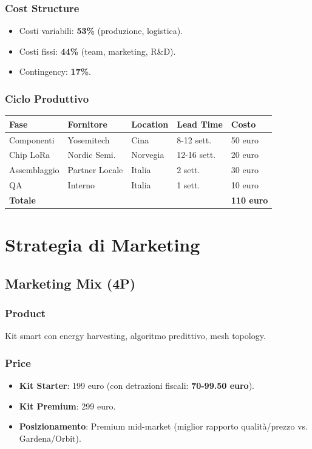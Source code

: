 \documentclass[11pt,a4paper]{report}
\begin{document}
\subsection{Cost Structure}
\begin{itemize}
\item Costi variabili: {\bf 53\%} (produzione, logistica).
\item Costi fissi: {\bf 44\%} (team, marketing, R\&D).
\item Contingency: {\bf 17\%}.
\end{itemize}

\subsection{Ciclo Produttivo}
\begin{longtable}{|L{3cm}|L{2.5cm}|L{2cm}|L{2cm}|C{1.5cm}|}
\hline
{\bf Fase} & {\bf Fornitore} & {\bf Location} & {\bf Lead Time} & {\bf Costo} \\ \hline
Componenti & Yosemitech & Cina & 8-12 sett. & 50 euro \\
Chip LoRa & Nordic Semi. & Norvegia & 12-16 sett. & 20 euro \\
Assemblaggio & Partner Locale & Italia & 2 sett. & 30 euro \\
QA & Interno & Italia & 1 sett. & 10 euro \\ \hline
{\bf Totale} & & & & {\bf 110 euro} \\ \hline
\end{longtable}

\chapter{Strategia di Marketing}
\label{ch:marketing}

\section{Marketing Mix (4P)}
\subsection{Product}
Kit smart con energy harvesting, algoritmo predittivo, mesh topology.

\subsection{Price}
\begin{itemize}
\item {\bf Kit Starter}: 199 euro (con detrazioni fiscali: {\bf 70-99.50 euro}).
\item {\bf Kit Premium}: 299 euro.
\item {\bf Posizionamento}: Premium mid-market (miglior rapporto qualità/prezzo vs. Gardena/Orbit).
\end{itemize}
\end{document}
